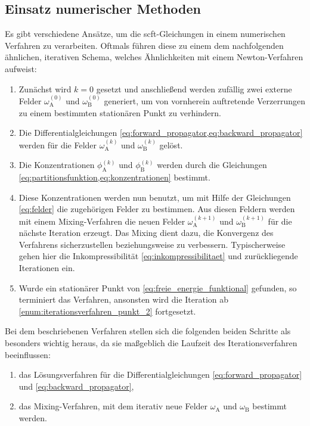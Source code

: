 \documentclass[../main.tex]{subfiles}
\begin{document}
\subsection*{Einsatz numerischer Methoden} %

Es gibt verschiedene Ansätze, um die \ac{scft}-Gleichungen in einem numerischen Verfahren zu verarbeiten.
Oftmals führen diese zu einem dem nachfolgenden ähnlichen, iterativen Schema, welches Ähnlichkeiten mit einem Newton-Verfahren aufweist:

\begin{enumerate}[label={\itshape\roman*.},ref={\itshape\roman*}]
    \item Zunächst wird $k = 0$ gesetzt und anschließend werden zufällig zwei externe Felder $\omega^{(0)}_{\mathrm{A}}$ und $\omega^{(0)}_{\mathrm{B}}$ generiert, um von vornherein auftretende Verzerrungen zu einem bestimmten stationären Punkt zu verhindern.
    \item\label{enum:iterationsverfahren_punkt_2} Die Differentialgleichungen \cref{eq:forward_propagator,eq:backward_propagator} werden für die Felder $\omega^{(k)}_{\mathrm{A}}$ und $\omega^{(k)}_{\mathrm{B}}$ gelöst.
    \item Die Konzentrationen $\phi^{(k)}_{\mathrm{A}}$ und $\phi^{(k)}_{\mathrm{B}}$ werden durch die Gleichungen \cref{eq:partitionsfunktion,eq:konzentrationen} bestimmt.
    \item Diese Konzentrationen werden nun benutzt, um mit Hilfe der Gleichungen \cref{eq:felder} die zugehörigen Felder zu bestimmen.
    Aus diesen Feldern werden mit einem Mixing-Verfahren die neuen Felder $\omega^{(k+1)}_{\mathrm{A}}$ und $\omega^{(k+1)}_{\mathrm{B}}$ für die nächste Iteration erzeugt.
    Das Mixing dient dazu, die Konvergenz des Verfahrens sicherzustellen beziehungsweise zu verbessern.
    Typischerweise gehen hier die Inkompressibilität \cref{eq:inkompressibilitaet} und zurückliegende Iterationen ein.
    \item Wurde ein stationärer Punkt von \cref{eq:freie_energie_funktional} gefunden, so terminiert das Verfahren, ansonsten wird die Iteration ab \cref{enum:iterationsverfahren_punkt_2} fortgesetzt.
\end{enumerate}
%
Bei dem beschriebenen Verfahren stellen sich die folgenden beiden Schritte als besonders wichtig heraus, da sie maßgeblich die Laufzeit des Iterationsverfahren beeinflussen:
\begin{enumerate}[label={\itshape\roman*.}]
    \item das Lösungsverfahren für die Differentialgleichungen \cref{eq:forward_propagator} und \cref{eq:backward_propagator},
    \item das Mixing-Verfahren, mit dem iterativ neue Felder $\omega_{\mathrm{A}}$ und $\omega_{\mathrm{B}}$ bestimmt werden.
\end{enumerate}
\end{document}
